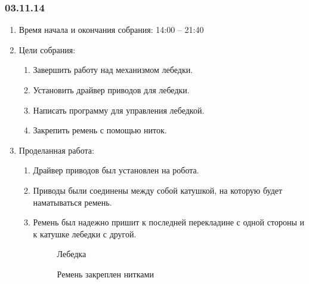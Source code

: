 	
\subsubsection{03.11.14}

\begin{enumerate}
	\item Время начала и окончания собрания:
	14:00 – 21:40
	\item Цели собрания:
	\begin{enumerate}
	  \item	Завершить работу над механизмом лебедки.
	  
	  \item	Установить драйвер приводов для лебедки.
	  
	  \item	Написать программу для управления лебедкой.
	  
	  \item	Закрепить ремень с помощью ниток.
	  
    \end{enumerate}
    
	\item Проделанная работа:
	\begin{enumerate}
	  \item	Драйвер приводов был установлен на робота.
      
      \item	Приводы были соединены между собой катушкой, на которую будет наматываться ремень.
      
      \item	Ремень был надежно пришит к последней перекладине с одной стороны и к катушке лебедки с другой.
      
      \begin{figure}[H]
      	\begin{minipage}[h]{0.4\linewidth}
      	\end{minipage}
      	\hfill
      	\begin{minipage}[h]{0.27\linewidth}
      	\end{minipage}
      	\hfill
      	\begin{minipage}[h]{0.27\linewidth}
      	\end{minipage}
      	\vfill
      	\begin{minipage}[h]{0.4\linewidth}
      		\caption{Лебедка}
      	\end{minipage}
      	\hfill
      	\begin{minipage}[h]{0.58\linewidth}
      		\caption{Ремень закреплен нитками}
      	\end{minipage}
      \end{figure}
      

\end{enumerate}
\end{enumerate}

